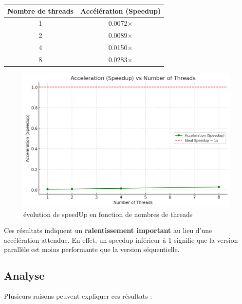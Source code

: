 \documentclass[a4paper,12pt]{article}
\begin{document}
\begin{center}
\begin{tabular}{|c|c|}
\hline
\textbf{Nombre de threads} & \textbf{Accélération (Speedup)} \\
\hline
1 & 0.0072$\times$ \\
2 & 0.0089$\times$ \\
4 & 0.0150$\times$ \\
8 & 0.0283$\times$ \\
\hline
\end{tabular}
\end{center}
\begin{figure}[H]
    \centering
    \includegraphics[width=1\linewidth]{imgs/chart_2.png}
    \caption{évolution de speedUp en fonction de nombres de threads}
\end{figure}
Ces résultats indiquent un \textbf{ralentissement important} au lieu d'une accélération attendue. En effet, un speedup inférieur à 1 signifie que la version parallèle est moins performante que la version séquentielle.

\subsection{Analyse}

Plusieurs raisons peuvent expliquer ces résultats :
\end{document}
